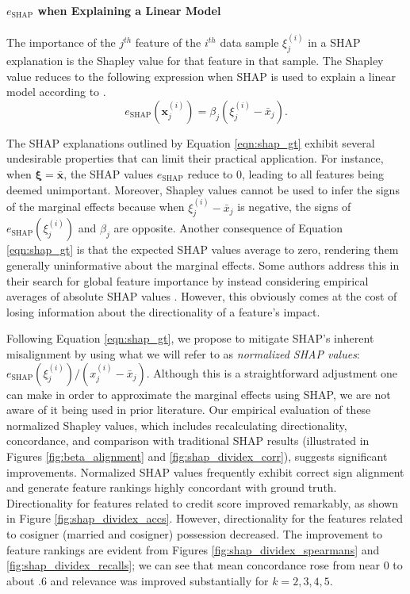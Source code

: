 \documentclass[mnsc,blindrev]{informs3}
\begin{document}
         \paragraph{$e_{\text{SHAP}}$ when Explaining a Linear Model}
              The importance of the $j^{th}$ feature of the $i^{th}$ data sample $\xi^{(i)}_j$ in a SHAP explanation is the Shapley value for that feature in that sample. The Shapley value reduces to the following expression when SHAP is used to explain a linear model according to \cite{StrumbeljErik2014Epma,lundberg17shap}. 
             \begin{equation}
                \label{eqn:shap_gt}
                e_\text{SHAP}(\mathbf{x}^{(i)}_j) = \beta_j (\xi^{(i)}_j - \bar{x}_j).
             \end{equation}

            
The SHAP explanations outlined by Equation \ref{eqn:shap_gt} exhibit several undesirable properties that can limit their practical application. For instance, when $\boldsymbol{\xi}=\bar{\mathbf{x}}$, the SHAP values $e_\text{SHAP}$ reduce to 0, leading to all features being deemed unimportant. Moreover, Shapley values cannot be used to infer the signs of the marginal effects because when $\xi^{(i)}_j - \bar{x}_j$ is negative, the signs of $e_{\text{SHAP}}(\xi^{(i)}_j)$ and $\beta_j$ are opposite. Another consequence of Equation \ref{eqn:shap_gt}  is that the expected SHAP values average to zero, rendering them generally uninformative about the marginal effects. Some authors address this in their search for global feature importance by instead considering empirical averages of absolute SHAP values \cite{lenaers23rent,maeng23vr,guenther2023useful}. However, this obviously comes at the cost of losing information about the directionality of a feature's impact.

             Following Equation \ref{eqn:shap_gt}, we propose to mitigate SHAP's inherent misalignment by using what we will refer to as \emph{normalized SHAP values}: $e_{\text{SHAP}}(\xi^{(i)}_j) / (x^{(i)}_j - \bar{x}_j)$. Although this is a straightforward adjustment one can make  in order to approximate the marginal effects using SHAP, we are not aware of it being used in prior literature.  Our empirical evaluation of these normalized Shapley values, which includes recalculating directionality, concordance, and comparison with traditional SHAP results (illustrated in Figures \ref{fig:beta_alignment} and \ref{fig:shap_dividex_corr}), suggests significant improvements. Normalized SHAP values frequently exhibit correct sign alignment and generate feature rankings highly concordant with ground truth. Directionality for features related to credit score improved remarkably, as shown in Figure \ref{fig:shap_dividex_accs}. However, directionality for the features related to cosigner (married and cosigner) possession decreased. The improvement to feature rankings are evident from Figures \ref{fig:shap_dividex_spearmans} and \ref{fig:shap_dividex_recalls}; we can see that mean concordance rose from near 0 to about .6 and relevance was improved substantially for $k=2,3,4,5$. 
             
\end{document}
